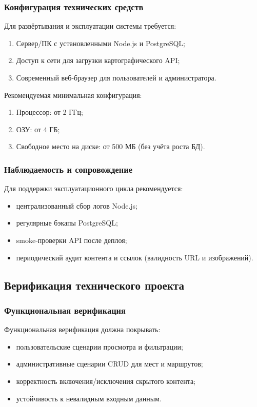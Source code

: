 \subsubsection{Конфигурация технических средств}
Для развёртывания и эксплуатации системы требуется:
\begin{enumerate}
	\item Сервер/ПК с установленными Node.js и PostgreSQL;
	\item Доступ к сети для загрузки картографического API;
	\item Современный веб-браузер для пользователей и администратора.
\end{enumerate}

Рекомендуемая минимальная конфигурация:
\begin{enumerate}
	\item Процессор: от 2 ГГц;
	\item ОЗУ: от 4 ГБ;
	\item Свободное место на диске: от 500 МБ (без учёта роста БД).
\end{enumerate}

\subsubsection{Наблюдаемость и сопровождение}
Для поддержки эксплуатационного цикла рекомендуется:
\begin{itemize}
	\item централизованный сбор логов Node.js;
	\item регулярные бэкапы PostgreSQL;
	\item smoke-проверки API после деплоя;
	\item периодический аудит контента и ссылок (валидность URL и изображений).
\end{itemize}

\subsection{Верификация технического проекта}

\subsubsection{Функциональная верификация}
Функциональная верификация должна покрывать:
\begin{itemize}
	\item пользовательские сценарии просмотра и фильтрации;
	\item административные сценарии CRUD для мест и маршрутов;
	\item корректность включения/исключения скрытого контента;
	\item устойчивость к невалидным входным данным.
\end{itemize}

